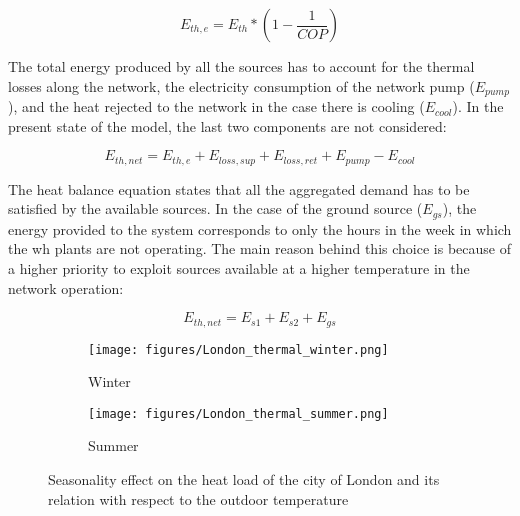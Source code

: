 \documentclass{article}
\begin{document}
\begin{equation}
E_{th,e} = E_{th}* \left(1-\frac{1}{COP}\right) 
\end{equation}

The total energy produced by all the sources has to account for the thermal losses along the network, the electricity consumption of the network pump ($E_{pump}$), and the heat rejected to the network in the case there is cooling ($E_{cool}$). In the present state of the model, the last two components are not considered:

\begin{equation}
E_{th,net} = E_{th,e} + E_{loss,sup} + E_{loss,ret} + E_{pump} - E_{cool}
\end{equation}

The heat balance equation states that all the aggregated demand has to be satisfied by the available sources. In the case of the ground source ($E_{gs}$), the energy provided to the system corresponds to only the hours in the week in which the \gls{wh} plants are not operating. The main reason behind this choice is because of a higher priority to exploit sources available at a higher temperature  in the network operation:

\begin{equation}
E_{th,net} = E_{s1} + E_{s2}+ E_{gs}
\end{equation}


\begin{figure}[h]
\begin{subfigure}{\textwidth}
\texttt{[image: figures/London\_thermal\_winter.png]}
\caption{Winter}
\label{fig:London_thermal_winter}
\end{subfigure}

\begin{subfigure}{\textwidth}
\texttt{[image: figures/London\_thermal\_summer.png]}
\caption{Summer}
\label{fig:London_thermal_summer}
\end{subfigure}

\caption{Seasonality effect on the heat load of the city of London and its relation with respect to the outdoor temperature}
\label{fig:london_thermal}
\end{figure}
\end{document}
